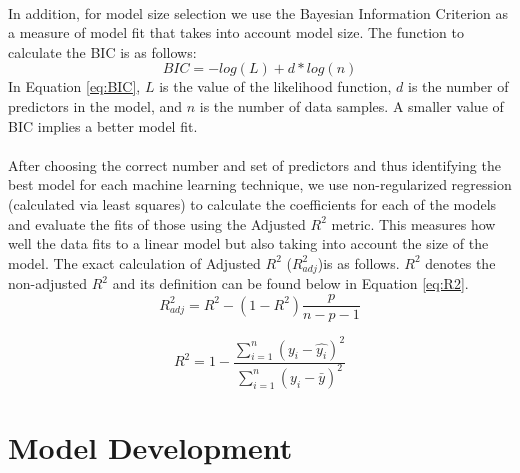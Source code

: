 \documentclass{article}
\begin{document}
\null\\
In addition, for model size selection we use the Bayesian Information Criterion as a measure of model fit that takes into account model size.  The function to calculate the BIC is as follows:
\begin{equation}
BIC=-log(L)+d*log(n)
\label{eq:BIC}
\end{equation}
In Equation \ref{eq:BIC}, $L$ is the value of the likelihood function, $d$ is the number of predictors in the model, and $n$ is the number of data samples.  A smaller value of BIC implies a better model fit.  \\
\null\\
After choosing the correct number and set of predictors and thus identifying the best model for each machine learning technique, we use non-regularized regression (calculated via least squares) to calculate the coefficients for each of the models and evaluate the fits of those using the Adjusted $R^2$ metric. This measures how well the data fits to a linear model but also taking into account the size of the model.  The exact calculation of Adjusted $R^2$ ($R^2_{adj}$)is as follows.  $R^2$ denotes the non-adjusted $R^2$ and its definition can be found below in Equation \ref{eq:R2}.
\begin{equation}
R^2_{adj} = R^2-(1-R^2)\frac{p}{n-p-1}
\label{eq:AdjR2}
\end{equation}

\begin{equation}
	R^2=1-\frac{\sum_{i=1}^n (y_i-\hat{y_i})^2}{\sum_{i=1}^n (y_i-\bar{y})^2}
	\label{eq:R2}
\end{equation}
%
\section{Model Development}
\end{document}
